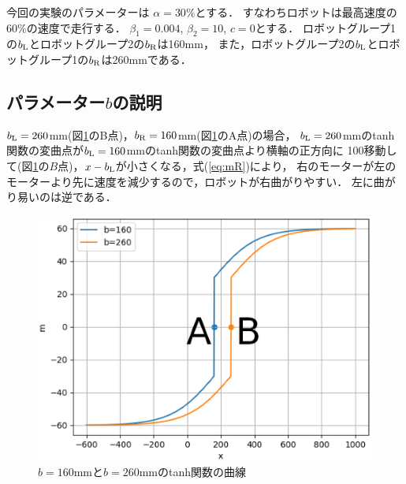 今回の実験のパラメーターは
$\alpha=30\%$とする．
すなわちロボットは最高速度の60\%の速度で走行する．
$\beta_1=0.004$,
$\beta_2=10$,
$c=0$とする．
ロボットグループ1の$b_{\rm L}$とロボットグループ2の$b_{\rm R}$は160mm，
また，ロボットグループ2の$b_{\rm L}$とロボットグループ1の$b_{\rm R}$は260mmである．

\subsection{パラメーター$b$の説明}
$b_{\rm L}=260$mm(図\ref{fitan}のB点)，$b_{\rm R}=160$mm(図\ref{fitan}のA点)の場合，
$b_{\rm L}=260$mmのtanh関数の変曲点が$b_{\rm L}=160$mmのtanh関数の変曲点より横軸の正方向に
100移動して(図\ref{fitan}の$B$点)，$x-b_{\rm L}$が小さくなる，式(\ref{eq:mR})により，
右のモーターが左のモーターより先に速度を減少するので，ロボットが右曲がりやすい．
左に曲がり易いのは逆である．
\begin{figure}[!ht]
    \centering
    \includegraphics[width=0.7\linewidth]{tanh.eps} 
    \caption{$b=160$mmと$b=260$mmのtanh関数の曲線}
    \label{fitan}
\end{figure}

